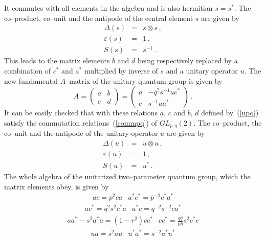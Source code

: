 \documentclass[a4paper,12pt]{article}
\numberwithin{equation}{section}
\begin{document}
It commutes with all elements in the algebra and is also hermitian $s = s^\ast$.
The co--product, co--unit and the antipode of the central element $s$ are given by
\begin{eqnarray}
\Delta \left( s \right) &=& s \otimes s \label{Ds} \, , \\
\varepsilon \left( s \right) &=& 1 \, , \\
S \left( s \right) &=& s^{-1} \label{Ss} \, .  
\end{eqnarray}
This leads to the matrix elements $b$ and $d$ being respectively replaced by
  a combination of $c^\ast$ and $a^\ast$ multiplied by inverse of $s$ and a unitary operator $u$.
 The new fundamental $A$--matrix of the unitary
  quantum group is given by
\begin{equation}\label{upq}
A = \left(
\begin{array}{cc}
a & b \\
c & d
\end{array}
\right) = \left(
\begin{array}{cc}
a & - \bar q^2 s^{-1} u c^\ast \\
c & s^{-1} u a^\ast
\end{array}
\right) \, .
\end{equation}
It can be easily checked that with these relations $a$, $c$ and $b$, $d$ defined by~(\ref{upq})
 satisfy the commutation relations~(\ref{commpq}) of $GL_{p,q}\left( 2 \right)$.
The co--product, the co--unit and the antipode of the unitary operator $u$ are given by
\begin{eqnarray}
\Delta \left(u \right) &=& u \otimes u \label{Du} \, , \\
\varepsilon \left( u \right) &=& 1 \, , \\ 
S \left( u \right) &=& u^\ast \label{Su} \, .
\end{eqnarray}
The whole algebra of the unitarized two--parameter quantum group, which the matrix elements obey, is given by
$$
\begin{array}{cc}
a c = p^2  c a & a^\ast c^\ast = \bar p ^{-2} c^\ast a^\ast 
\end{array}
$$
$$
\begin{array}{cc}
a c^\ast = q^2 s^2 c^\ast a & a^\ast c = \bar q ^{-2} s^{-2} c a^\ast 
\end{array}
$$
$$
\begin{array}{cc}
a a^\ast - s^2 a^\ast a = \left( 1 -r^2\right) c c^\ast & c c^\ast = \frac{q \bar q}{p \bar p} s^2 c^\ast c 
\end{array}
$$
$$
\begin{array}{cc}
u a = s^2 a u & u^\ast a^\ast = s^{-2} a^\ast u^\ast 
\end{array}
$$
\end{document}
